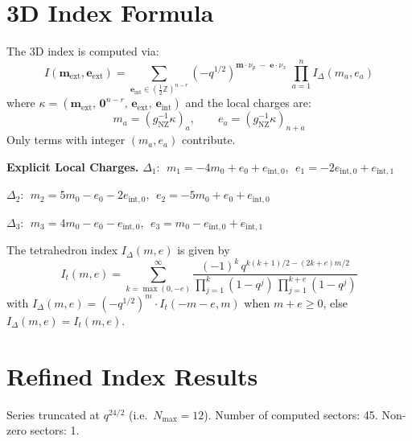 \documentclass[11pt,a4paper]{article}
\newcommand{\IDelta}{I_{\Delta}}
\begin{document}
\section{3D Index Formula}
The 3D index is computed via:
\[
  I(\mathbf{m}_{\text{ext}}, \mathbf{e}_{\text{ext}}) = \sum_{\mathbf{e}_{\text{int}} \in (\tfrac{1}{2}\mathbb{Z})^{n-r}} (-q^{1/2})^{\mathbf{m} \cdot \nu_p \;-\; \mathbf{e} \cdot \nu_x} \;\prod_{a=1}^{n} \IDelta(m_a, e_a)
\]
where $\kappa = (\mathbf{m}_{\text{ext}},\, \mathbf{0}^{n-r},\, \mathbf{e}_{\text{ext}},\, \mathbf{e}_{\text{int}})$ and the local charges are:
\[
  m_a = (g_{\text{NZ}}^{-1}\kappa)_a, \qquad   e_a = (g_{\text{NZ}}^{-1}\kappa)_{n+a}
\]
Only terms with integer $(m_a, e_a)$ contribute.

\noindent\textbf{Explicit Local Charges.}
$\Delta_{1}$: $\;m_{1} = -4m_{0} + e_{0} + e_{\text{int},0}$, $\;e_{1} = -2e_{\text{int},0} + e_{\text{int},1}$

$\Delta_{2}$: $\;m_{2} = 5m_{0} - e_{0} - 2e_{\text{int},0}$, $\;e_{2} = -5m_{0} + e_{0} + e_{\text{int},0}$

$\Delta_{3}$: $\;m_{3} = 4m_{0} - e_{0} - e_{\text{int},0}$, $\;e_{3} = m_{0} - e_{\text{int},0} + e_{\text{int},1}$

The tetrahedron index $\IDelta(m, e)$ is given by
\[
  I_t(m, e) = \sum_{k=\max(0,-e)}^{\infty} \frac{(-1)^k \, q^{k(k+1)/2 - (2k+e)m/2}}{\prod_{j=1}^{k}(1-q^j) \,\prod_{j=1}^{k+e}(1-q^j)}
\]
with $\IDelta(m,e) = (-q^{1/2})^m \cdot I_t(-m-e, m)$ when $m + e \ge 0$, else $\IDelta(m,e) = I_t(m, e)$.

\section{Refined Index Results}
Series truncated at $q^{24/2}$ (i.e.\ $N_{\max} = 12$).
Number of computed sectors: 45.
Non-zero sectors: 1.
\end{document}
